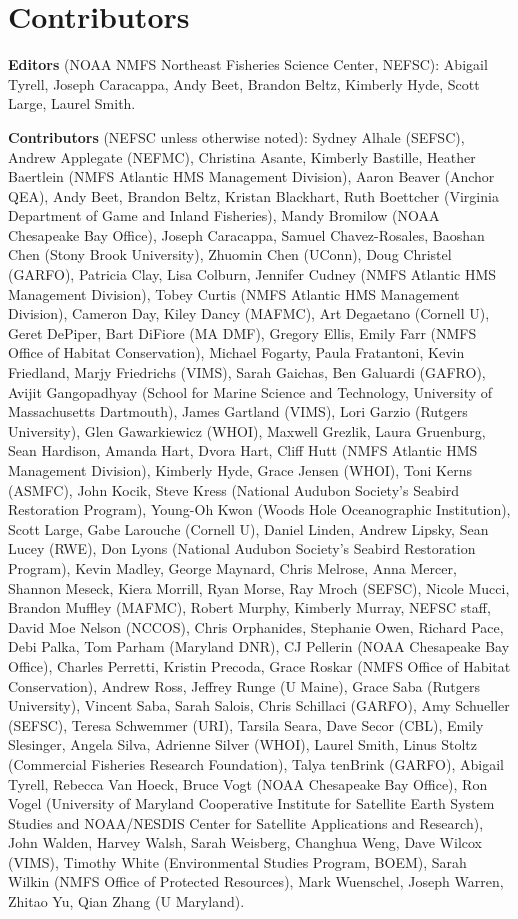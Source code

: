 \documentclass[
  10pt,
]{article}
\begin{document}
\section{Contributors}\label{contributors}

\textbf{Editors} (NOAA NMFS Northeast Fisheries Science Center, NEFSC):
Abigail Tyrell, Joseph Caracappa, Andy Beet, Brandon Beltz, Kimberly
Hyde, Scott Large, Laurel Smith.

\textbf{Contributors} (NEFSC unless otherwise noted): Sydney Alhale
(SEFSC), Andrew Applegate (NEFMC), Christina Asante, Kimberly Bastille,
Heather Baertlein (NMFS Atlantic HMS Management Division), Aaron Beaver
(Anchor QEA), Andy Beet, Brandon Beltz, Kristan Blackhart, Ruth
Boettcher (Virginia Department of Game and Inland Fisheries), Mandy
Bromilow (NOAA Chesapeake Bay Office), Joseph Caracappa, Samuel
Chavez-Rosales, Baoshan Chen (Stony Brook University), Zhuomin Chen
(UConn), Doug Christel (GARFO), Patricia Clay, Lisa Colburn, Jennifer
Cudney (NMFS Atlantic HMS Management Division), Tobey Curtis (NMFS
Atlantic HMS Management Division), Cameron Day, Kiley Dancy (MAFMC), Art
Degaetano (Cornell U), Geret DePiper, Bart DiFiore (MA DMF), Gregory
Ellis, Emily Farr (NMFS Office of Habitat Conservation), Michael
Fogarty, Paula Fratantoni, Kevin Friedland, Marjy Friedrichs (VIMS),
Sarah Gaichas, Ben Galuardi (GAFRO), Avijit Gangopadhyay (School for
Marine Science and Technology, University of Massachusetts Dartmouth),
James Gartland (VIMS), Lori Garzio (Rutgers University), Glen
Gawarkiewicz (WHOI), Maxwell Grezlik, Laura Gruenburg, Sean Hardison,
Amanda Hart, Dvora Hart, Cliff Hutt (NMFS Atlantic HMS Management
Division), Kimberly Hyde, Grace Jensen (WHOI), Toni Kerns (ASMFC), John
Kocik, Steve Kress (National Audubon Society's Seabird Restoration
Program), Young-Oh Kwon (Woods Hole Oceanographic Institution), Scott
Large, Gabe Larouche (Cornell U), Daniel Linden, Andrew Lipsky, Sean
Lucey (RWE), Don Lyons (National Audubon Society's Seabird Restoration
Program), Kevin Madley, George Maynard, Chris Melrose, Anna Mercer,
Shannon Meseck, Kiera Morrill, Ryan Morse, Ray Mroch (SEFSC), Nicole
Mucci, Brandon Muffley (MAFMC), Robert Murphy, Kimberly Murray, NEFSC
staff, David Moe Nelson (NCCOS), Chris Orphanides, Stephanie Owen,
Richard Pace, Debi Palka, Tom Parham (Maryland DNR), CJ Pellerin (NOAA
Chesapeake Bay Office), Charles Perretti, Kristin Precoda, Grace Roskar
(NMFS Office of Habitat Conservation), Andrew Ross, Jeffrey Runge (U
Maine), Grace Saba (Rutgers University), Vincent Saba, Sarah Salois,
Chris Schillaci (GARFO), Amy Schueller (SEFSC), Teresa Schwemmer (URI),
Tarsila Seara, Dave Secor (CBL), Emily Slesinger, Angela Silva, Adrienne
Silver (WHOI), Laurel Smith, Linus Stoltz (Commercial Fisheries Research
Foundation), Talya tenBrink (GARFO), Abigail Tyrell, Rebecca Van Hoeck,
Bruce Vogt (NOAA Chesapeake Bay Office), Ron Vogel (University of
Maryland Cooperative Institute for Satellite Earth System Studies and
NOAA/NESDIS Center for Satellite Applications and Research), John
Walden, Harvey Walsh, Sarah Weisberg, Changhua Weng, Dave Wilcox (VIMS),
Timothy White (Environmental Studies Program, BOEM), Sarah Wilkin (NMFS
Office of Protected Resources), Mark Wuenschel, Joseph Warren, Zhitao
Yu, Qian Zhang (U Maryland).
\end{document}
